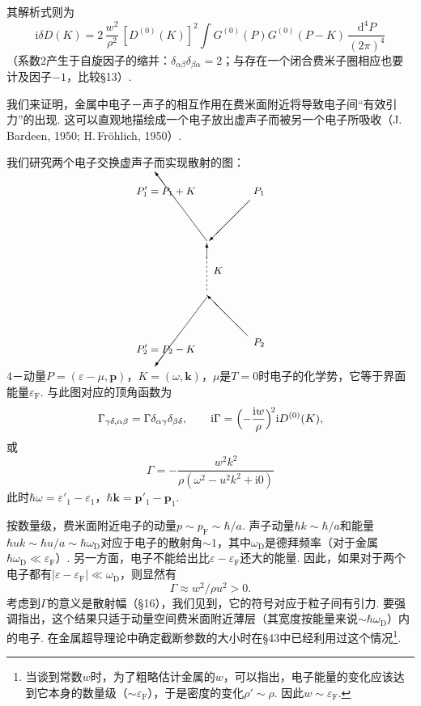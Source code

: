 其解析式则为
\begin{equation}
\mathrm{i}\delta D(K)=2\,\frac{w^2}{\rho^2}\,[D^{(0)}(K)]^2
\int G^{(0)}(P)G^{(0)}(P-K)\,\frac{\mathrm{d}^4P}{(2\pi)^4}
\end{equation}
（系数2产生于自旋因子的缩并：$\delta_{\alpha\beta}\delta_{\beta\alpha}=2$；与存在一个闭合费米子圈相应也要计及因子$-1$，比较§13）.

我们来证明，金属中电子－声子的相互作用在费米面附近将导致电子间“有效引力”的出现. 这可以直观地描绘成一个电子放出虚声子而被另一个电子所吸收（J.\,Bardeen, 1950; H.\,Fr\"{o}hlich, 1950\mbox{）.}

我们研究两个电子交换虚声子而实现散射的图：
\begin{equation}
\setlength{\unitlength}{1pt}%
\begin{picture}(190,158)(0,0)
  \put(92,102){\vector(-3,4){46}}
  \put(56,146){\makebox(0,0){\small$P'_1=P_1+K$}}
  \put(130,138){\vector(-1,-1){36}}
  \put(138,146){\makebox(0,0){\small$P_1$}}
  \multiput(92,58)(0,4){8}{\line(0,1){2}}
  \put(92,86){\vector(0,1){14}}
  \put(102,76){\makebox(0,0){\small$K$}}
  \put(128,18){\vector(-1,1){36}}
  \put(138,12){\makebox(0,0){\small$P_2$}}
  \put(92,52){\vector(-3,-4){46}}
  \put(56,6){\makebox(0,0){\small$P'_2=P_2-K$}}
\end{picture}
\end{equation}
4－动量$P=(\varepsilon-\mu,\bm{p})$，$K=(\omega,\bm{k})$，$\mu$是$T=0$时电子的化学势，它等于界面能量$\varepsilon_{\mathrm F}$. 与此图对应的顶角函数为
\begin{equation*}
\Gamma_{\gamma\delta,\alpha\beta}=\Gamma\delta_{\alpha\gamma}\delta_{\beta\delta},
\qquad
\mathrm{i}\Gamma=\Bigl(-\frac{\mathrm{i}w}{\rho}\Bigr)^{\!2}\mathrm{i}D^{(0)}(K),
\end{equation*}
或
\begin{equation}
\Gamma=-\frac{w^2k^2}{\rho(\omega^2-u^2k^2+\mathrm{i}0)}
\end{equation}
此时$\hbar\omega=\varepsilon'_1-\varepsilon_1$，$\hbar\bm{k}=\bm{p}'_1-\bm{p}_1$.

按数量级，费米面附近电子的动量$p\sim p_{\mathrm F}\sim\hbar/a$. 声子动量$\hbar k\sim\hbar/a$和能量$\hbar uk\sim\hbar u/a\sim\hbar\omega_{\mathrm D}$对应于电子的散射角$\sim1$，其中$\omega_{\mathrm D}$是德拜频率（对于金属$\hbar\omega_{\mathrm D}\ll\varepsilon_{\mathrm F}$）. 另一方面，电子不能给出比$\varepsilon-\varepsilon_{\mathrm F}$还大的能量. 因此，如果对于两个电子都有$|\varepsilon-\varepsilon_{\mathrm F}|\ll\omega_{\mathrm D}$，则显然有
\begin{equation}
\Gamma\approx w^2/\rho u^2>0.
\end{equation}
考虑到$\Gamma$的意义是散射幅（§16），我们见到，它的符号对应于粒子间有引力. 要强调指出，这个结果只适于动量空间费米面附近薄层（其宽度按能量来说$\sim\hbar\omega_{\mathrm D}$）内的电子. 在金属超导理论中确定截断参数的大小时在§43中已经利用过这个情况\footnote{当谈到常数$w$时，为了粗略估计金属的$w$，可以指出，电子能量的变化应该达到它本身的数量级（$\sim\varepsilon_{\mathrm F}$），于是密度的变化$\rho'\sim\rho$. 因此$w\sim\varepsilon_{\mathrm F}$.}.

